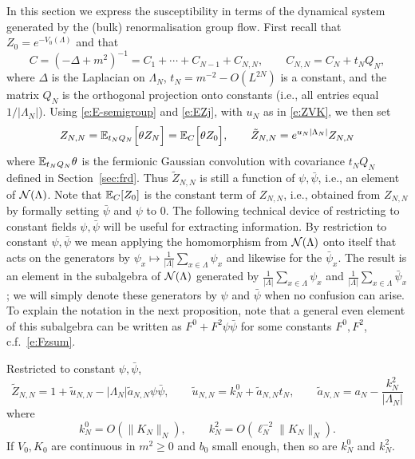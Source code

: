 \documentclass[11pt]{amsart}
\numberwithin{equation}{section}
\numberwithin{theorem}{section}
\newcommand{\1}{{\bf 1}}
\begin{document}
In this section we express the susceptibility in terms of the
dynamical system generated by the (bulk) renormalisation group flow.
%
First recall that $Z_0=e^{-V_0(\Lambda)}$ and that
\begin{equation}
  \label{e:S4C}
  C = (-\Delta+m^2)^{-1} = C_1 + \cdots + C_{N-1} + C_{N,N}, \qquad C_{N,N} = C_N + t_N Q_N,
\end{equation}
where $\Delta$ is the Laplacian on $\Lambda_N$, $t_N = m^{-2}- O(L^{2N})$ is a constant,
  and the matrix $Q_N$ is the orthogonal projection onto constants (i.e., all entries equal $1/|\Lambda_N|$).
%
Using \eqref{e:E-semigroup} and \eqref{e:EZj}, with $u_N$ as in \eqref{e:ZVK},
we then set
\begin{equation} \label{e:ZNN-def}
  Z_{N,N} = \mathbb{E}_{t_NQ_N}\Bigl[{\theta Z_N}\Bigr] =  \mathbb{E}_C\Bigl[{\theta Z_0}\Bigr],
  \qquad \tilde Z_{N,N} = e^{u_N|\Lambda_N|} Z_{N,N} 
\end{equation}
where $\mathbb{E}_{t_NQ_N}\theta$ is the fermionic Gaussian convolution with
covariance $t_NQ_N$ defined in Section~\ref{sec:frd}.  Thus
$\tilde Z_{N,N}$ is still a function of $\psi,\bar\psi$, i.e., an
element of $\mathcal N(\Lambda)$. Note that $\mathbb{E}_{C}[Z_{0}]$ is the constant term of $Z_{N,N}$, i.e.,
obtained from $Z_{N,N}$ by formally setting $\bar\psi$ and $\psi$ to $0$.
The following technical device of restricting to
constant fields $\psi,\bar\psi$ will be useful for extracting
information.  By restriction to constant $\psi,\bar\psi$ we mean
applying the homomorphism from $\mathcal N(\Lambda)$ onto itself that acts on
the generators by
$\psi_x \mapsto \frac{1}{|\Lambda|}\sum_{x\in\Lambda} \psi_x$ and
likewise for the $\bar\psi_x$.  The result is an element in the
subalgebra of $\mathcal N(\Lambda)$ generated by
$\frac{1}{|\Lambda|}\sum_{x\in\Lambda} \psi_x$ and
$\frac{1}{|\Lambda|}\sum_{x\in\Lambda} \bar\psi_x$; we will simply
denote these generators by $\psi$ and $\bar\psi$ when no confusion can
arise. To explain the notation in the next proposition, note
that a general even element of this subalgebra can be written as
$F^{0}+F^{2}\psi\bar\psi$ for some constants $F^{0},F^{2}$, c.f.\ \eqref{e:Fzsum}.

\begin{proposition} \label{prop:ZNN}
  Restricted to constant $\psi,\bar\psi$,
  \begin{equation} \label{e:ZNN}
    \tilde Z_{N,N}
    =
    1+\tilde u_{N,N} - |\Lambda_N| \tilde a_{N,N}\psi\bar\psi,
    \qquad
    \tilde u_{N,N} =k_N^0+\tilde a_{N,N}t_N,
    \qquad \tilde a_{N,N} = a_N- \frac{k_N^2}{|\Lambda_N|}
  \end{equation}
  where 
  \begin{equation} \label{e:ZNN-bd}
    k_N^0 = O(\|K_N\|_N), \qquad k_N^2=O(\ell_N^{-2}\|K_N\|_N)
    .
  \end{equation}
  If $V_{0}, K_{0}$ are continuous in $m^{2}\geq 0$ and
  $b_{0}$ small enough, then so are $k_{N}^{0}$ and $k^{2}_{N}$.
\end{proposition}
\end{document}
